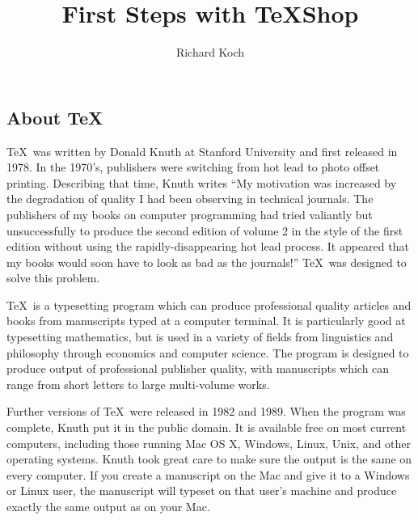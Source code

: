 \documentclass[11pt, oneside]{amsart}
\title{First Steps with TeXShop }
\author{Richard Koch}
\begin{document}
\maketitle
\begin{multicols}{2}

\section{About \TeX}

\thispagestyle{empty}

\TeX\ was written by Donald Knuth at Stanford University and first released in 1978. In the 1970's, publishers were switching from hot lead to photo offset printing. Describing that time, Knuth writes ``My motivation was increased by the degradation of quality I had been observing in technical journals. The publishers of my books on computer programming had tried valiantly but unsuccessfully to produce the second edition of volume 2 in the style of the first edition without using the rapidly-disappearing hot lead process. It appeared that my books would soon have to look as bad as the journals!'' \TeX\ was designed to solve this problem.

\TeX\ is a typesetting program which can produce professional quality articles and books from manuscripts typed at a computer terminal. It is particularly good at typesetting mathematics, but is used in a variety of fields from linguistics and philosophy through economics and computer science. The program is designed to produce output of professional publisher quality, with manuscripts which can range from short letters to large multi-volume works.

Further versions of \TeX\ were released in 1982 and 1989. When the program was complete, Knuth put it in the public domain. It is available free on most current computers, including those running Mac OS X, Windows, Linux, Unix, and other operating systems. Knuth took great care to make sure the output is the same on every computer. If you create a manuscript on the Mac and give it to a Windows or Linux user, the manuscript will typeset on that user's machine and produce exactly the same output as on your Mac. 


\end{multicols}
\end{document}
